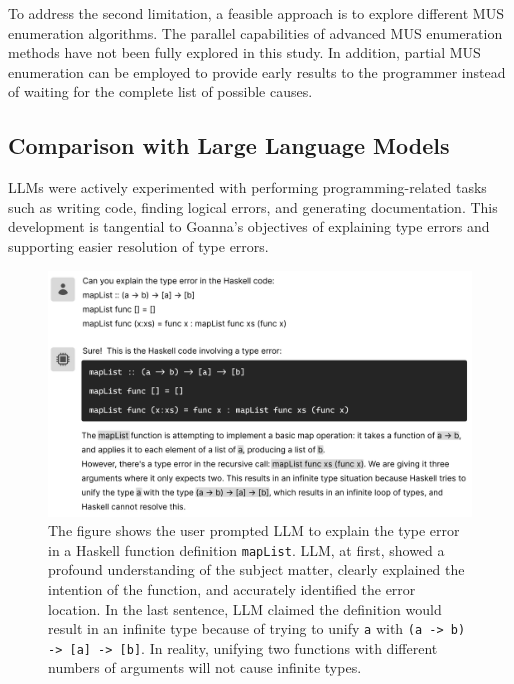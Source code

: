 \documentclass[pdflatex,lineno,sn-nature,Numbered]{sn-jnl}%
\begin{document}
To address the second limitation, a feasible approach is to explore different MUS enumeration algorithms. The parallel capabilities of advanced MUS enumeration methods \cite{Zhao2016-bu, Bendik2020-pz} have not been fully explored in this study. In addition, partial MUS enumeration \cite{Previti2013-mr, Liffiton2016-xi} can be employed to provide early results to the programmer instead of waiting for the complete list of possible causes.



\subsection{Comparison with Large Language Models} \label{sec:llm}
    
LLMs were actively experimented with performing programming-related tasks such as writing code, finding logical errors, and generating documentation.  This development is tangential to Goanna's objectives of explaining type errors and supporting easier resolution of type errors. 

\begin{figure}[hbt]
  \includegraphics[width=\linewidth]{images/LLM.pdf}
  \caption[LLM explaining a type error; it began very accurate, then went on to give incorrect and contradicting analysis]{\label{fig:llm}
  The figure shows the user prompted LLM to explain the type error in a Haskell function definition \texttt{mapList}. LLM, at first, showed a profound understanding of the subject matter, clearly explained the intention of the function, and accurately identified the error location. In the last sentence, LLM claimed the definition would result in an infinite type because of trying to unify \texttt{a} with \texttt{(a -> b) -> [a] -> [b]}. In reality, unifying two functions with different numbers of arguments will not cause infinite types. 
    }
\end{figure}
\end{document}
